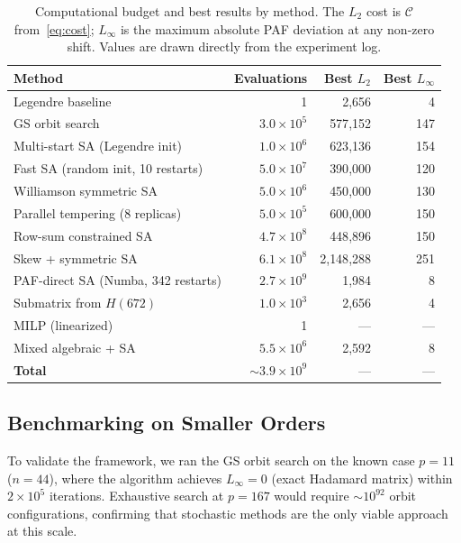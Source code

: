 \documentclass[11pt,a4paper]{article}
\newcommand{\Linf}{L_\infty}
\newcommand{\Ltwo}{L_2}
\begin{document}
\begin{table}[t]
  \centering
  \caption{Computational budget and best results by method.  The $\Ltwo$
    cost is $\mathcal{C}$ from~\eqref{eq:cost}; $\Linf$ is the maximum
    absolute PAF deviation at any non-zero shift.  Values are drawn
    directly from the experiment log.}\label{tab:budget}
  \begin{tabular}{lrrr}
    \toprule
    \textbf{Method} & \textbf{Evaluations} & \textbf{Best $\Ltwo$} &
    \textbf{Best $\Linf$} \\
    \midrule
    Legendre baseline              &            1 &    2{,}656 &    4 \\
    GS orbit search                & $3.0 \times 10^5$ & 577{,}152 &  147 \\
    Multi-start SA (Legendre init) & $1.0 \times 10^6$ & 623{,}136 &  154 \\
    Fast SA (random init, 10 restarts) & $5.0 \times 10^7$ & 390{,}000 &  120 \\
    Williamson symmetric SA        & $5.0 \times 10^6$ & 450{,}000 &  130 \\
    Parallel tempering (8 replicas)& $5.0 \times 10^5$ & 600{,}000 &  150 \\
    Row-sum constrained SA         & $4.7 \times 10^8$ & 448{,}896 &  150 \\
    Skew + symmetric SA            & $6.1 \times 10^8$ & 2{,}148{,}288 &  251 \\
    PAF-direct SA (Numba, 342 restarts) & $2.7 \times 10^9$ &    1{,}984 &    8 \\
    Submatrix from $H(672)$        & $1.0 \times 10^3$ &    2{,}656 &    4 \\
    MILP (linearized)              &            1 &    ---     &  --- \\
    Mixed algebraic + SA           & $5.5 \times 10^6$ &    2{,}592 &    8 \\
    \midrule
    \textbf{Total}            & $\sim\!3.9 \times 10^9$ & --- & --- \\
    \bottomrule
  \end{tabular}
\end{table}

\subsection{Benchmarking on Smaller Orders}

To validate the framework, we ran the GS orbit search on the known case
$p = 11$ ($n = 44$), where the algorithm achieves $\Linf = 0$ (exact
Hadamard matrix) within $2 \times 10^5$ iterations.  Exhaustive search at
$p = 167$ would require $\sim\!10^{92}$ orbit configurations, confirming
that stochastic methods are the only viable approach at this scale.
\end{document}
